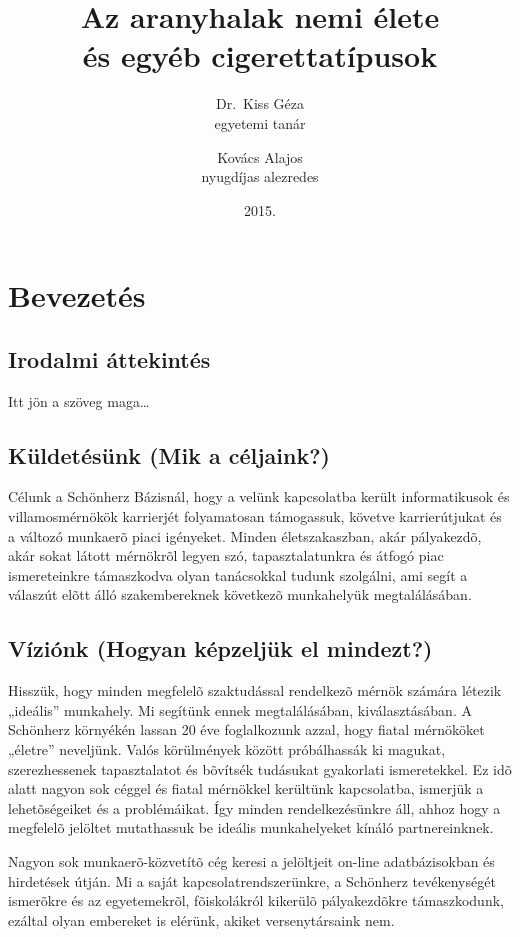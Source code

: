 \documentclass[a4paper]{book}
\begin{document}
\title{Az aranyhalak nemi élete \\
és egyéb cigerettatípusok}
\author{Dr.~Kiss Géza \\ egyetemi tanár \and
Kovács Alajos \\ nyugdíjas alezredes}
\date{$~$\\[2cm]
2015.}
\maketitle

\tableofcontents

\chapter{Bevezetés}
\section{Irodalmi áttekintés}
Itt jön a szöveg maga\dots

\section{Küldetésünk (Mik a céljaink?)}
Célunk a Schönherz Bázisnál, hogy a velünk kapcsolatba került informatikusok és villamosmérnökök karrierjét folyamatosan támogassuk, követve karrierútjukat és a változó munkaerõ piaci igényeket. Minden életszakaszban, akár pályakezdõ, akár sokat látott mérnökrõl legyen szó, tapasztalatunkra és átfogó piac ismereteinkre támaszkodva olyan tanácsokkal tudunk szolgálni, ami segít a válaszút elõtt álló szakembereknek következõ munkahelyük megtalálásában.
\section{Víziónk (Hogyan képzeljük el mindezt?)}
Hisszük, hogy minden megfelelõ szaktudással rendelkezõ mérnök számára létezik „ideális” munkahely. Mi segítünk ennek megtalálásában, kiválasztásában. A Schönherz környékén lassan 20 éve foglalkozunk azzal, hogy fiatal mérnököket „életre” neveljünk. Valós körülmények között próbálhassák ki magukat, sze\-rezhessenek tapasztalatot és bõvítsék tudásukat gyakorlati ismeretekkel. Ez idõ alatt nagyon sok céggel és fiatal mérnökkel kerültünk kapcsolatba, ismerjük a lehetõségeiket és a problémáikat. Így minden rendelkezésünkre áll, ahhoz hogy a megfelelõ jelöltet mutathassuk be ideális munkahelyeket kínáló partnereinknek.

Nagyon sok munkaerõ-közvetítõ cég keresi a jelöltjeit on-line adatbázisokban és hirdetések útján. Mi a saját kapcsolatrendszerünkre, a Schönherz tevékenységét ismerõkre és az egyetemekrõl, fõiskolákról kikerülõ pályakezdõkre támaszkodunk, ezáltal olyan embereket is elérünk, akiket versenytársaink nem.
\end{document}
